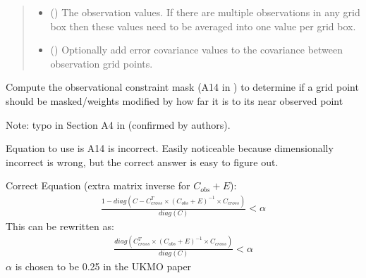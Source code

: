 \documentclass[letterpaper,10pt,english]{sphinxmanual}
\begin{document}
\begin{fulllineitems}
\begin{quote}
\begin{description}
\begin{itemize}
\item {}
\sphinxAtStartPar
{} (\sphinxstyleliteralemphasis{\sphinxupquote{{[}}}\sphinxstyleliteralemphasis{\sphinxupquote{{]}}}) \textendash{} The observation values. If there are multiple observations in any
grid box then these values need to be averaged into one value per
grid box.

\item {}
\sphinxAtStartPar
{} (\sphinxstyleliteralemphasis{\sphinxupquote{ | }}) \textendash{} Optionally add error covariance values to the covariance between
observation grid points.

\end{itemize}

\end{description}\end{quote}

\begin{fulllineitems}
\label{\detokenize{kriging:glomar_gridding.kriging.SimpleKriging.constraint_mask}}
\pysigstartsignatures
\pysiglinewithargsret
{}
{}
{}
\pysigstopsignatures
\sphinxAtStartPar
Compute the observational constraint mask (A14 in ) to
determine if a grid point should be masked/weights modified by how far
it is to its near observed point

\sphinxAtStartPar
Note: typo in Section A4 in  (confirmed by authors).

\sphinxAtStartPar
Equation to use is A14 is incorrect. Easily noticeable because
dimensionally incorrect is wrong, but the correct answer is easy to
figure out.

\sphinxAtStartPar
Correct Equation (extra matrix inverse for \(C_{obs} + E\)):
\begin{equation*}
\begin{split}\frac{
    1 - diag(C - C_{cross}^T \times (C_{obs} + E)^{-1}
             \times C_{cross})
}{diag(C)} < \alpha\end{split}
\end{equation*}
\sphinxAtStartPar
This can be re\sphinxhyphen{}written as:
\begin{equation*}
\begin{split}\frac{
    diag(C_{cross}^T \times (C_{obs} + E)^{-1} \times C_{cross})
}{diag(C)} < \alpha\end{split}
\end{equation*}
\sphinxAtStartPar
\(\alpha\) is chosen to be 0.25 in the UKMO paper


\end{fulllineitems}
\end{fulllineitems}
\end{document}
